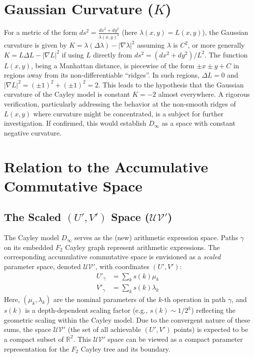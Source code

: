 \documentclass[12pt, a4paper]{article}
\begin{document}
\section{Gaussian Curvature ($K$)}
For a metric of the form $ds^2 = \frac{dx^2 + dy^2}{\lambda(x,y)^2}$ (here $\lambda(x,y) = L(x,y)$), the Gaussian curvature is given by $K = \lambda (\Delta \lambda) - |\nabla \lambda|^2$ assuming $\lambda$ is $C^2$, or more generally $K = L \Delta L - |\nabla L|^2$ if using $L$ directly from $ds^2 = (dx^2+dy^2)/L^2$.
The function $L(x,y)$, being a Manhattan distance, is piecewise of the form $\pm x \pm y + C$ in regions away from its non-differentiable ``ridges''. In such regions, $\Delta L = 0$ and $|\nabla L|^2 = (\pm 1)^2 + (\pm 1)^2 = 2$.
This leads to the hypothesis that the Gaussian curvature of the Cayley model is constant $K = -2$ almost everywhere. A rigorous verification, particularly addressing the behavior at the non-smooth ridges of $L(x,y)$ where curvature might be concentrated, is a subject for further investigation. If confirmed, this would establish $D_\infty$ as a space with constant negative curvature.

\section{Relation to the Accumulative Commutative Space}

\subsection{The Scaled $(U',V')$ Space ($\mathcal{UV}'$)}
The Cayley model $D_\infty$ serves as the (new) arithmetic expression space. Paths $\gamma$ on its embedded $F_2$ Cayley graph represent arithmetic expressions. The corresponding accumulative commutative space is envisioned as a \emph{scaled} parameter space, denoted $\mathcal{UV}'$, with coordinates $(U',V')$:
\begin{align*}
U'_\gamma &= \sum_{k} s(k)\mu_k \\
V'_\gamma &= \sum_{k} s(k)\lambda_k
\end{align*}
Here, $(\mu_k, \lambda_k)$ are the nominal parameters of the $k$-th operation in path $\gamma$, and $s(k)$ is a depth-dependent scaling factor (e.g., $s(k) \sim 1/2^k$) reflecting the geometric scaling within the Cayley model. Due to the convergent nature of these sums, the space $\mathcal{UV}'$ (the set of all achievable $(U',V')$ points) is expected to be a compact subset of $\mathbb{R}^2$. This $\mathcal{UV}'$ space can be viewed as a compact parameter representation for the $F_2$ Cayley tree and its boundary.
\end{document}
